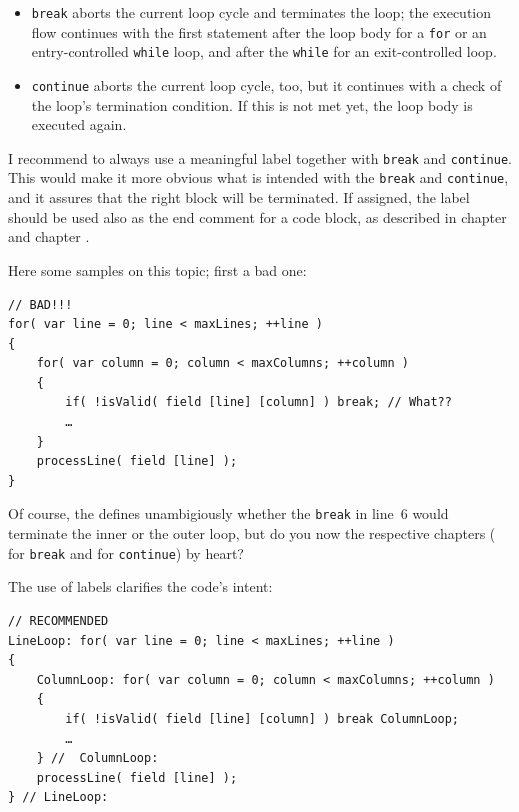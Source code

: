 \begin{itemize}
	\item{\lstinline|break| aborts the current loop cycle and terminates the loop; the execution flow continues with the first statement after the loop body for a \lstinline|for| or an entry-controlled \lstinline|while| loop, and after the \lstinline|while| for an exit-controlled loop.}
	\item{\lstinline|continue| aborts the current loop cycle, too, but it continues with a check of the loop's termination condition. If this is not met yet, the loop body is executed again.}
\end{itemize}

I recommend to always use a meaningful label together with \lstinline|break| and \lstinline|continue|. This would make it more obvious what is intended with the \lstinline|break| and \lstinline|continue|, and it assures that the right block will be terminated. If assigned, the label should be used also as the end comment for a code block, as described in chapter  and chapter .

Here some samples on this topic; first a bad one:
\begin{lstlisting}
// BAD!!!
for( var line = 0; line < maxLines; ++line )
{
    for( var column = 0; column < maxColumns; ++column )
    {
        if( !isValid( field [line] [column] ) break; // What??
        …
    }
    processLine( field [line] );
}
\end{lstlisting}
Of course, the \jlsref defines unambigiously whether the \lstinline|break| in line~6 would terminate the inner or the outer loop, but do you now the respective chapters (\autocite{ORACLE_DOC_LANGUAGE_SPECIFICATION:Break} for \lstinline|break| and \autocite{ORACLE_DOC_LANGUAGE_SPECIFICATION:Continue} for \lstinline|continue|) by heart?

The use of labels clarifies the code's intent: 
\begin{lstlisting}
// RECOMMENDED
LineLoop: for( var line = 0; line < maxLines; ++line )
{
    ColumnLoop: for( var column = 0; column < maxColumns; ++column )
    {
        if( !isValid( field [line] [column] ) break ColumnLoop;
        …
    } //  ColumnLoop:
    processLine( field [line] );
} // LineLoop:
\end{lstlisting}

